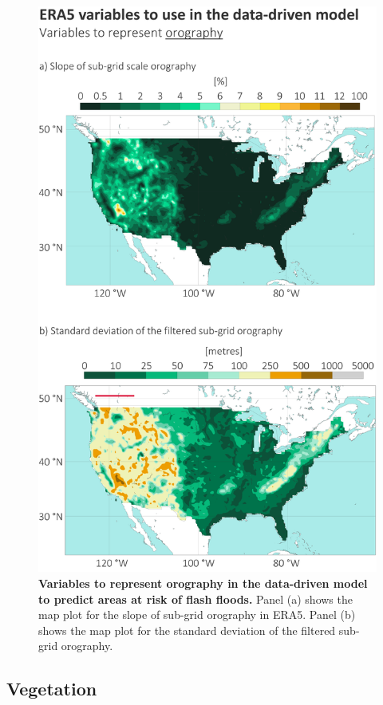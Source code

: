 \begin{figure}[htbp]
\centering
\includegraphics[width=\textwidth]{orography.png}
\caption{\textbf{Variables to represent orography in the data-driven model to predict areas at risk of flash floods.} Panel (a) shows the map plot for the slope of sub-grid orography in ERA5. Panel (b) shows the map plot for the standard deviation of the filtered sub-grid orography.}
\label{fig:orography}
\end{figure}


\subsection{Vegetation}

